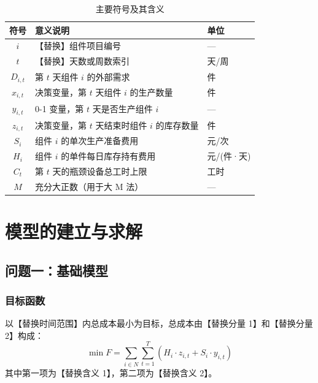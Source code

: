 \documentclass[12pt,a4paper,fontset=fandol]{ctexart}
\begin{document}
\begin{table}[H]
    \centering
    \renewcommand{\arraystretch}{1.4}
    \caption{主要符号及其含义}
    \label{tab:symbols}
    \begin{tabular}{cll}
        \toprule
        符号 & 意义说明 & 单位 \\
        \midrule
        $i$ & 【替换】组件项目编号 & — \\
        $t$ & 【替换】天数或周数索引 & 天/周 \\
        $D_{i,t}$ & 第 $t$ 天组件 $i$ 的外部需求 & 件 \\
        $x_{i,t}$ & 决策变量，第 $t$ 天组件 $i$ 的生产数量 & 件 \\
        $y_{i,t}$ & 0-1 变量，第 $t$ 天是否生产组件 $i$ & — \\
        $z_{i,t}$ & 决策变量，第 $t$ 天结束时组件 $i$ 的库存数量 & 件 \\
        $S_i$ & 组件 $i$ 的单次生产准备费用 & 元/次 \\
        $H_i$ & 组件 $i$ 的单件每日库存持有费用 & 元/(件·天) \\
        $C_t$ & 第 $t$ 天的瓶颈设备总工时上限 & 工时 \\
        $M$ & 充分大正数（用于大 M 法） & — \\
        \bottomrule
    \end{tabular}
\end{table}

\section{模型的建立与求解}

\subsection{问题一：基础模型}

\subsubsection{目标函数}

以【替换时间范围】内总成本最小为目标，总成本由【替换分量 1】和【替换分量 2】构成：
\begin{equation}
    \min F = \sum_{i \in N} \sum_{t=1}^{T} \left( H_i \cdot z_{i,t} + S_i \cdot y_{i,t} \right)
    \label{eq:obj1}
\end{equation}
其中第一项为【替换含义 1】，第二项为【替换含义 2】。
\end{document}
